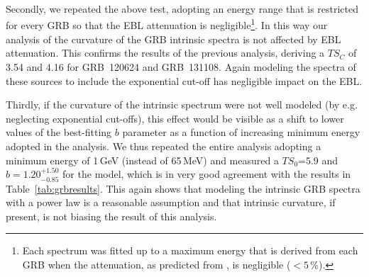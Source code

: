 \documentclass[12pt,preprint]{aastex}
\begin{document}
{Secondly, we repeated the above test, adopting an energy range
  that is restricted for every GRB so that the EBL  attenuation is
  negligible\footnote{Each spectrum was fitted up to a maximum energy
    that is derived from each GRB when the attenuation, as predicted
    from \cite{finke10}, is negligible ($<5$\,\%).}. In this way our
  analysis of the curvature of the GRB intrinsic spectra is not
  affected by EBL attenuation. This confirms the results of the
  previous analysis, deriving a $TS_C$ of 3.54 and 4.16 for GRB~120624
  and GRB~131108. Again modeling the spectra of these sources to include
  the exponential cut-off has negligible impact on the EBL.
}

{Thirdly, if the curvature of the intrinsic spectrum were not well
  modeled (by e.g. neglecting exponential cut-offs), this effect would
  be visible as a shift to lower values of the best-fitting
  $b$ parameter as a function of increasing minimum energy adopted in the analysis. 
We thus repeated the entire analysis adopting a minimum energy of
1\,GeV (instead of 65\,MeV) and measured a $TS_0$=5.9 and
$b=1.20^{+1.50}_{-0.85}$ for the \cite{finke10} model, which is in very good
agreement with the results in Table~\ref{tab:grbresults}. This again
shows that modeling the intrinsic GRB spectra with a power law is a
reasonable assumption and that intrinsic curvature, if present, is not biasing the
result of this analysis.}
\end{document}
